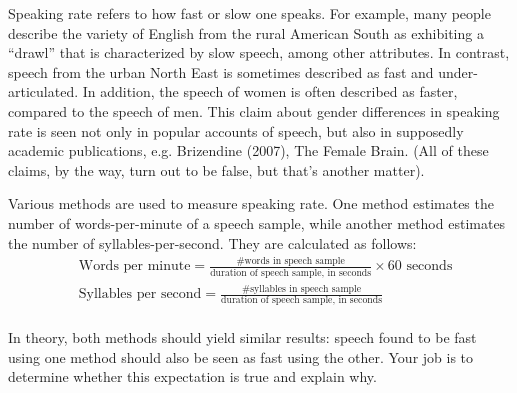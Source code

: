 \documentclass[lab=1,title={Speaking rate},turnin=false]{com310lab}
\newcommand{\wpm}{\mbox{Words per minute} = \frac{\mbox{\# words in speech sample}}{\mbox{duration of speech sample, in seconds}} \times 60 \mbox{ seconds}}
\newcommand{\sps}{\mbox{Syllables per second} = \frac{\mbox{\# syllables in speech sample}}{\mbox{duration of speech sample, in seconds}}}
\begin{document}
\maketitle

\begin{overview}
	Speaking rate refers to how fast or slow one speaks.
	For example, many people describe the variety of English from the rural American South as exhibiting a ``drawl'' that is characterized by slow speech, among other attributes.
	In contrast, speech from the urban North East is sometimes described as fast and under-articulated.
	In addition, the speech of women is often described as faster, compared to the speech of men.
	This claim about gender differences in speaking rate is seen not only in popular accounts of speech, but also in supposedly academic publications, e.g. Brizendine (2007), The Female Brain.
	(All of these claims, by the way, turn out to be false, but that’s another matter).
\end{overview}


\begin{problem}
	Various methods are used to measure speaking rate.
	One method estimates the number of words-per-minute of a speech sample, while another method estimates the number of syllables-per-second.
	They are calculated as follows:\\

	\begin{equation*}
	\begin{aligned}
		&\wpm\\
		&\sps
	\end{aligned}
	\end{equation*}\\

	In theory, both methods should yield similar results: speech found to be fast using one method should also be seen as fast using the other.
	Your job is to determine whether this expectation is true and explain why.
\end{problem}
\end{document}

